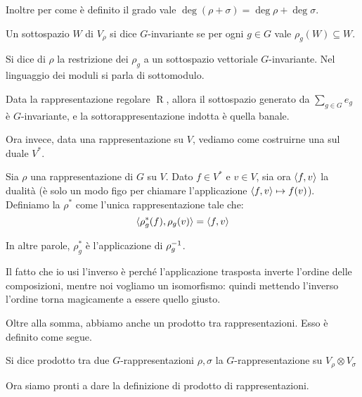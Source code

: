 \documentclass[a4paper,10pt,oneside]{math_article}
\newcommand{\tensor}{\otimes}
\DeclareMathOperator{\Reg}{R}
\begin{document}
    Inoltre per come è definito il grado vale $\deg(\rho+\sigma)=\deg\rho+\deg\sigma$.
    
    \begin{mydef}
     Un sottospazio $W$ di $V_\rho$ si dice $G$-invariante se per ogni $g\in G$ vale $\rho_g(W)\subseteq W$.
    \end{mydef}

    \begin{mydef}
     Si dice  di $\rho$ la restrizione dei $\rho_g$ a un sottospazio vettoriale $G$-invariante. Nel linguaggio dei moduli si parla di sottomodulo.
    \end{mydef}
    
    \begin{myexample}
      Data la rappresentazione regolare $\Reg$, allora il sottospazio generato da $\sum_{g\in G} e_g$ è $G$-invariante, e la sottorappresentazione indotta è quella banale.
    \end{myexample}
       
    Ora invece, data una rappresentazione su $V$, vediamo come costruirne una sul duale $V^*$.
    \begin{mydef}
     Sia $\rho$ una rappresentazione di $G$ su $V$. Dato $f\in V^*$ e $v\in V$, sia ora $\langle f , v\rangle$ la dualità (è solo un modo figo per chiamare l'applicazione $\langle f , v\rangle \mapsto f(v)$). Definiamo la  $\rho^*$ come l'unica rappresentazione tale che:
     \[
      \langle\rho^*_g(f) , \rho_g (v)\rangle=\langle f , v\rangle
     \]
    \end{mydef}
    
    In altre parole, $\rho^*_g$ è l'applicazione  di $\rho_g^{-1}$.

    Il fatto che io usi l'inverso è perché l'applicazione trasposta inverte l'ordine delle composizioni, mentre noi vogliamo un isomorfismo: quindi mettendo l'inverso l'ordine torna magicamente a essere quello giusto.
    
    Oltre alla somma, abbiamo anche un prodotto tra rappresentazioni. Esso è definito come segue. 
    
    \begin{mydef}
     Si dice prodotto tra due $G$-rappresentazioni $\rho, \sigma$ la $G$-rappresentazione su $V_\rho \tensor V_\sigma$  
    \end{mydef}


    Ora siamo pronti a dare la definizione di prodotto di rappresentazioni.
\end{document}
